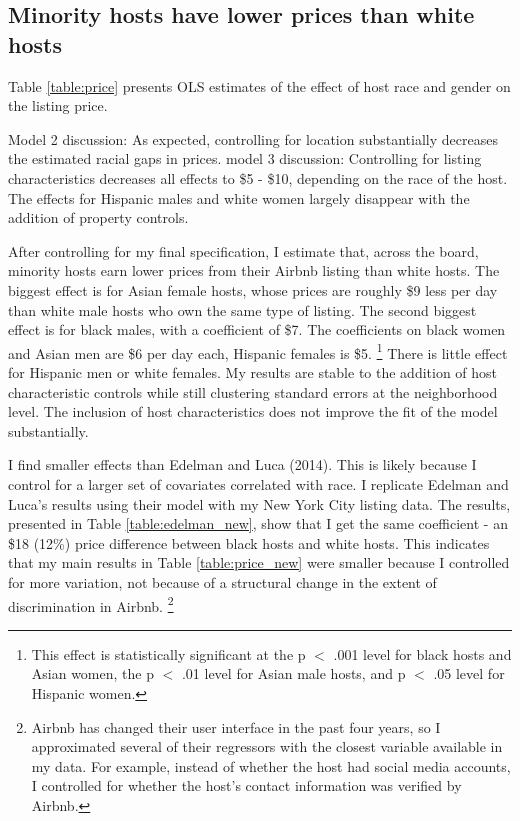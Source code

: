 \subsection*{Minority hosts have lower prices than white hosts} 
	\label{result1}

Table \ref{table:price} presents OLS estimates of the effect of host race and gender on the listing price. 

Model 2 discussion: As expected, controlling for location substantially decreases the estimated racial gaps in prices. 
model 3 discussion: Controlling for listing characteristics decreases all effects to \$5 - \$10, depending on the race of the host. The effects for Hispanic males and white women largely disappear with the addition of property controls.

After controlling for my final specification, I estimate that, across the board, minority hosts earn lower prices from their Airbnb listing than white hosts. The biggest effect is for Asian female hosts, whose prices are roughly \$9 less per day than white male hosts who own the same type of listing. The second biggest effect is for black males, with a coefficient of \$7. The coefficients on black women and Asian men are \$6 per day each, Hispanic females is \$5.%
	\footnote{This effect is statistically significant at the p $<$ .001 level for black hosts and Asian women, the p $<$ .01 level for Asian male hosts, and p $<$ .05 level for Hispanic women.}  
There is little effect for Hispanic men or white females. My results are stable to the addition of host characteristic controls while still clustering standard errors at the neighborhood level. The inclusion of host characteristics does not improve the fit of the model substantially.  

I find smaller effects than Edelman and Luca (2014). This is likely because I control for a larger set of covariates correlated with race. I replicate Edelman and Luca's results using their model with my New York City listing data. The results, presented in Table \ref{table:edelman_new}, show that I get the same coefficient - an \$18 (12\%) price difference between black hosts and white hosts. This indicates that my main results in Table \ref{table:price_new} were smaller because I controlled for more variation, not because of a structural change in the extent of discrimination in Airbnb.%
	\footnote{Airbnb has changed their user interface in the past four years, so I approximated several of their regressors with the closest variable available in my data. For example, instead of whether the host had social media accounts, I controlled for whether the host's contact information was verified by Airbnb.}



